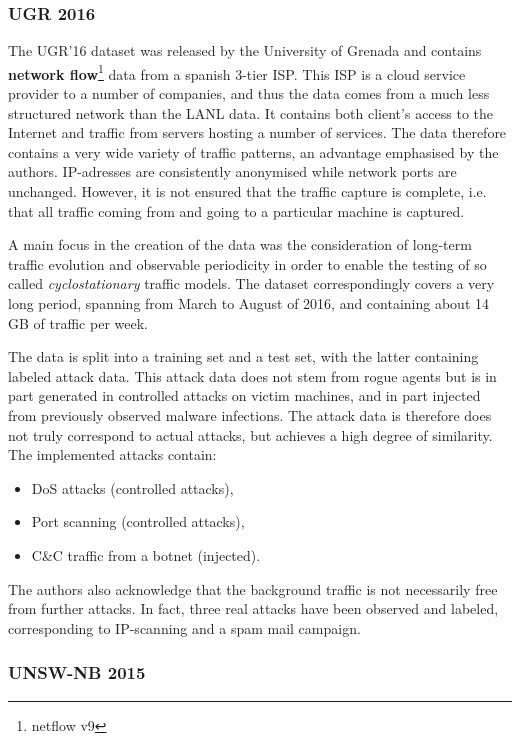 \subsubsection*{UGR 2016 \cite{macia2018ugr}}

The UGR'16 dataset was released by the University of Grenada and contains \textbf{network flow}\footnote{netflow v9} data from a spanish 3-tier ISP. This ISP is a cloud service provider to a number of companies, and thus the data comes from a much less structured network than the LANL data. It contains both client's access to the Internet and traffic from servers hosting a number of services. The data therefore contains a very wide variety of traffic patterns, an advantage emphasised by the authors. IP-adresses are consistently anonymised while network ports are unchanged. However, it is not ensured that the traffic capture is complete, i.e. that all traffic coming from and going to a particular machine is captured.

A main focus in the creation of the data was the consideration of long-term traffic evolution and observable periodicity in order to enable the testing of so called \textit{cyclostationary} traffic models. The dataset correspondingly covers a very long period, spanning from March to August of 2016, and containing about 14 GB of traffic per week. 

The data is split into a training set and a test set, with the latter containing labeled attack data. This attack data does not stem from rogue agents but is in part generated in controlled attacks on victim machines, and in part injected from previously observed malware infections. The attack data is therefore does not truly correspond to actual attacks, but achieves a high degree of similarity. The implemented attacks contain:
\begin{itemize}
\item DoS attacks (controlled attacks),
\item Port scanning (controlled attacks),
\item C\&C traffic from a botnet (injected).
\end{itemize}

The authors also acknowledge that the background traffic is not necessarily free from further attacks. In fact, three real attacks have been observed and labeled, corresponding to IP-scanning and a spam mail campaign.

\subsubsection*{UNSW-NB 2015 \cite{moustafa_unsw-nb15:_2015}}

